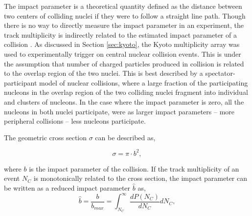 The impact parameter is a theoretical quantity defined as the distance between two centers of colliding nuclei if they were to follow a straight line path. Though there is no way to directly measure the impact parameter in an experiment, the track multiplicity is indirectly related to the estimated impact parameter of a collision \cite{impactpar}. As discussed in Section \ref{sec:kyoto}, the Kyoto multiplicity array was used to experimentally trigger on central nuclear collision events. This is under the assumption that number of charged particles produced in collision is related to the overlap region of the two nuclei. This is best described by a spectator-participant model of nuclear collisions, where a large fraction of the participating nucleons in the overlap region of the two colliding nuclei fragment into individual and clusters of nucleons. In the case where the impact parameter is zero, all the nucleons in both nuclei participate, were as larger impact parameters -- more peripheral collisions -- less nucleons participate. 



The geometric cross section $\sigma$ can be described as, 

\begin{equation}
\sigma = \pi \cdot b^2,
\label{eq:crossSect}
\end{equation}

where $b$ is the impact parameter of the collision.  If the track multiplicity of an event $N_C$ is monotonically related to the cross section, the impact parameter can be written as a reduced impact parameter $\hat{b}$ as,
\begin{equation}
\hat{b} =  \frac{b}{b_{max}} = \int^{\infty}_{N_C} \frac{dP(N_C)}{dN_C} dN_C,
\end{equation}

